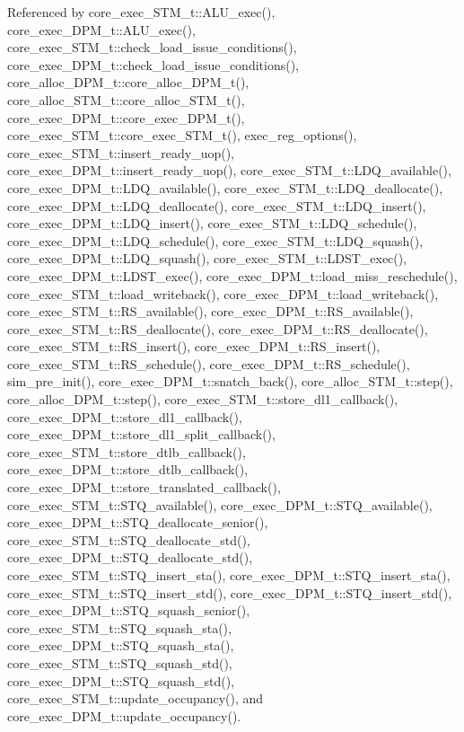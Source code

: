 Referenced by core\_\-exec\_\-STM\_\-t::ALU\_\-exec(), core\_\-exec\_\-DPM\_\-t::ALU\_\-exec(), core\_\-exec\_\-STM\_\-t::check\_\-load\_\-issue\_\-conditions(), core\_\-exec\_\-DPM\_\-t::check\_\-load\_\-issue\_\-conditions(), core\_\-alloc\_\-DPM\_\-t::core\_\-alloc\_\-DPM\_\-t(), core\_\-alloc\_\-STM\_\-t::core\_\-alloc\_\-STM\_\-t(), core\_\-exec\_\-DPM\_\-t::core\_\-exec\_\-DPM\_\-t(), core\_\-exec\_\-STM\_\-t::core\_\-exec\_\-STM\_\-t(), exec\_\-reg\_\-options(), core\_\-exec\_\-STM\_\-t::insert\_\-ready\_\-uop(), core\_\-exec\_\-DPM\_\-t::insert\_\-ready\_\-uop(), core\_\-exec\_\-STM\_\-t::LDQ\_\-available(), core\_\-exec\_\-DPM\_\-t::LDQ\_\-available(), core\_\-exec\_\-STM\_\-t::LDQ\_\-deallocate(), core\_\-exec\_\-DPM\_\-t::LDQ\_\-deallocate(), core\_\-exec\_\-STM\_\-t::LDQ\_\-insert(), core\_\-exec\_\-DPM\_\-t::LDQ\_\-insert(), core\_\-exec\_\-STM\_\-t::LDQ\_\-schedule(), core\_\-exec\_\-DPM\_\-t::LDQ\_\-schedule(), core\_\-exec\_\-STM\_\-t::LDQ\_\-squash(), core\_\-exec\_\-DPM\_\-t::LDQ\_\-squash(), core\_\-exec\_\-STM\_\-t::LDST\_\-exec(), core\_\-exec\_\-DPM\_\-t::LDST\_\-exec(), core\_\-exec\_\-DPM\_\-t::load\_\-miss\_\-reschedule(), core\_\-exec\_\-STM\_\-t::load\_\-writeback(), core\_\-exec\_\-DPM\_\-t::load\_\-writeback(), core\_\-exec\_\-STM\_\-t::RS\_\-available(), core\_\-exec\_\-DPM\_\-t::RS\_\-available(), core\_\-exec\_\-STM\_\-t::RS\_\-deallocate(), core\_\-exec\_\-DPM\_\-t::RS\_\-deallocate(), core\_\-exec\_\-STM\_\-t::RS\_\-insert(), core\_\-exec\_\-DPM\_\-t::RS\_\-insert(), core\_\-exec\_\-STM\_\-t::RS\_\-schedule(), core\_\-exec\_\-DPM\_\-t::RS\_\-schedule(), sim\_\-pre\_\-init(), core\_\-exec\_\-DPM\_\-t::snatch\_\-back(), core\_\-alloc\_\-STM\_\-t::step(), core\_\-alloc\_\-DPM\_\-t::step(), core\_\-exec\_\-STM\_\-t::store\_\-dl1\_\-callback(), core\_\-exec\_\-DPM\_\-t::store\_\-dl1\_\-callback(), core\_\-exec\_\-DPM\_\-t::store\_\-dl1\_\-split\_\-callback(), core\_\-exec\_\-STM\_\-t::store\_\-dtlb\_\-callback(), core\_\-exec\_\-DPM\_\-t::store\_\-dtlb\_\-callback(), core\_\-exec\_\-DPM\_\-t::store\_\-translated\_\-callback(), core\_\-exec\_\-STM\_\-t::STQ\_\-available(), core\_\-exec\_\-DPM\_\-t::STQ\_\-available(), core\_\-exec\_\-DPM\_\-t::STQ\_\-deallocate\_\-senior(), core\_\-exec\_\-STM\_\-t::STQ\_\-deallocate\_\-std(), core\_\-exec\_\-DPM\_\-t::STQ\_\-deallocate\_\-std(), core\_\-exec\_\-STM\_\-t::STQ\_\-insert\_\-sta(), core\_\-exec\_\-DPM\_\-t::STQ\_\-insert\_\-sta(), core\_\-exec\_\-STM\_\-t::STQ\_\-insert\_\-std(), core\_\-exec\_\-DPM\_\-t::STQ\_\-insert\_\-std(), core\_\-exec\_\-DPM\_\-t::STQ\_\-squash\_\-senior(), core\_\-exec\_\-STM\_\-t::STQ\_\-squash\_\-sta(), core\_\-exec\_\-DPM\_\-t::STQ\_\-squash\_\-sta(), core\_\-exec\_\-STM\_\-t::STQ\_\-squash\_\-std(), core\_\-exec\_\-DPM\_\-t::STQ\_\-squash\_\-std(), core\_\-exec\_\-STM\_\-t::update\_\-occupancy(), and core\_\-exec\_\-DPM\_\-t::update\_\-occupancy().
